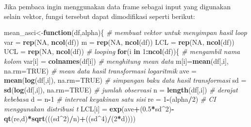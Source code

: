 \documentclass[]{book}
\newenvironment{Shaded}{\begin{snugshade}}{\end{snugshade}}
\newcommand{\KeywordTok}[1]{\textcolor[rgb]{0.13,0.29,0.53}{\textbf{#1}}}
\newcommand{\DataTypeTok}[1]{\textcolor[rgb]{0.13,0.29,0.53}{#1}}
\newcommand{\DecValTok}[1]{\textcolor[rgb]{0.00,0.00,0.81}{#1}}
\newcommand{\FloatTok}[1]{\textcolor[rgb]{0.00,0.00,0.81}{#1}}
\newcommand{\StringTok}[1]{\textcolor[rgb]{0.31,0.60,0.02}{#1}}
\newcommand{\CommentTok}[1]{\textcolor[rgb]{0.56,0.35,0.01}{\textit{#1}}}
\newcommand{\OtherTok}[1]{\textcolor[rgb]{0.56,0.35,0.01}{#1}}
\newcommand{\ControlFlowTok}[1]{\textcolor[rgb]{0.13,0.29,0.53}{\textbf{#1}}}
\newcommand{\OperatorTok}[1]{\textcolor[rgb]{0.81,0.36,0.00}{\textbf{#1}}}
\newcommand{\NormalTok}[1]{#1}
\begin{document}
Jika pembaca ingin menggunakan data frame sebagai input yang digunakan
selain vektor, fungsi tersebut dapat dimodifikasi seperti berikut:

\begin{Shaded}
\begin{Highlighting}[]
\NormalTok{mean_asci<-}\ControlFlowTok{function}\NormalTok{(df,alpha)\{}
  \CommentTok{# membuat vektor untuk menyimpan hasil loop}
\NormalTok{  var =}\StringTok{ }\KeywordTok{rep}\NormalTok{(}\OtherTok{NA}\NormalTok{, }\KeywordTok{ncol}\NormalTok{(df))}
\NormalTok{  m =}\StringTok{ }\KeywordTok{rep}\NormalTok{(}\OtherTok{NA}\NormalTok{, }\KeywordTok{ncol}\NormalTok{(df))}
\NormalTok{  LCL =}\StringTok{ }\KeywordTok{rep}\NormalTok{(}\OtherTok{NA}\NormalTok{, }\KeywordTok{ncol}\NormalTok{(df))}
\NormalTok{  UCL =}\StringTok{ }\KeywordTok{rep}\NormalTok{(}\OtherTok{NA}\NormalTok{, }\KeywordTok{ncol}\NormalTok{(df))}
  \CommentTok{# looping}
  \ControlFlowTok{for}\NormalTok{(i }\ControlFlowTok{in} \DecValTok{1}\OperatorTok{:}\KeywordTok{ncol}\NormalTok{(df))\{}
    \CommentTok{# mengambil nama kolom}
\NormalTok{    var[i] =}\StringTok{ }\KeywordTok{colnames}\NormalTok{(df[i])}
    \CommentTok{# menghitung mean data}
\NormalTok{    m[i]=}\KeywordTok{mean}\NormalTok{(df[,i], }\DataTypeTok{na.rm=}\OtherTok{TRUE}\NormalTok{)}
    \CommentTok{# mean data hasil transformasi logaritmik}
\NormalTok{    ave =}\StringTok{ }\KeywordTok{mean}\NormalTok{(}\KeywordTok{log}\NormalTok{(df[,i]), }\DataTypeTok{na.rm=}\OtherTok{TRUE}\NormalTok{)}
    \CommentTok{# simpangan baku data hasil transformasi}
\NormalTok{    sd =}\StringTok{ }\KeywordTok{sd}\NormalTok{(}\KeywordTok{log}\NormalTok{(df[,i]), }\DataTypeTok{na.rm=}\OtherTok{TRUE}\NormalTok{)}
    \CommentTok{# jumlah observasi}
\NormalTok{    n =}\StringTok{ }\KeywordTok{length}\NormalTok{(df[,i])}
    \CommentTok{# derajat kebebasa}
\NormalTok{    d =}\StringTok{ }\NormalTok{n}\OperatorTok{-}\DecValTok{1}
    \CommentTok{# interval keyakinan satu sisi}
\NormalTok{    re =}\StringTok{ }\DecValTok{1}\OperatorTok{-}\NormalTok{(alpha}\OperatorTok{/}\DecValTok{2}\NormalTok{)}
    \CommentTok{# CI menggunakan distribusi t}
\NormalTok{    LCL[i] =}\StringTok{ }\KeywordTok{exp}\NormalTok{(ave}\OperatorTok{+}\NormalTok{(}\FloatTok{0.5}\OperatorTok{*}\NormalTok{sd}\OperatorTok{^}\DecValTok{2}\NormalTok{)}\OperatorTok{-}\KeywordTok{qt}\NormalTok{(re,d)}\OperatorTok{*}\KeywordTok{sqrt}\NormalTok{(((sd}\OperatorTok{^}\DecValTok{2}\NormalTok{)}\OperatorTok{/}\NormalTok{n)}\OperatorTok{+}\NormalTok{((sd}\OperatorTok{^}\DecValTok{4}\NormalTok{)}\OperatorTok{/}\NormalTok{(}\DecValTok{2}\OperatorTok{*}\NormalTok{d))))}

\end{Highlighting}
\end{Shaded}
\end{document}

